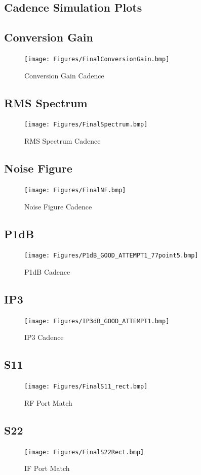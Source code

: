 \documentclass{article}                                                         %
\begin{document}
\newpage
\begin{appendices}
\section{Cadence Simulation Plots}\label{app:cresults}
\subsection{Conversion Gain}
\begin{figure}[H]
  \centering
  \texttt{[image: Figures/FinalConversionGain.bmp]}
  \caption{Conversion Gain Cadence}
    \label{fig:cGain}
\end{figure}
\subsection{RMS Spectrum}
\begin{figure}[H]
  \centering
  \texttt{[image: Figures/FinalSpectrum.bmp]}
  \caption{RMS Spectrum Cadence}
    \label{fig:cSpectrum}
\end{figure}
\subsection{Noise Figure}
\begin{figure}[H]
  \centering
  \texttt{[image: Figures/FinalNF.bmp]}
  \caption{Noise Figure Cadence}
    \label{fig:cNF}
\end{figure}
\subsection{P1dB}
\begin{figure}[H]
  \centering
  \texttt{[image: Figures/P1dB\_GOOD\_ATTEMPT1\_77point5.bmp]}
  \caption{P1dB Cadence}
    \label{fig:cP1db}
\end{figure}
\subsection{IP3}
\begin{figure}[H]
  \centering
  \texttt{[image: Figures/IP3dB\_GOOD\_ATTEMPT1.bmp]}
  \caption{IP3 Cadence}
    \label{fig:cIP3}
\end{figure}
\subsection{S11}
\begin{figure}[H]
  \centering
  \texttt{[image: Figures/FinalS11\_rect.bmp]}
  \caption{RF Port Match}
    \label{fig:cS11}
\end{figure}
\subsection{S22}
\begin{figure}[H]
  \centering
  \texttt{[image: Figures/FinalS22Rect.bmp]}
  \caption{IF Port Match}
    \label{fig:cS22}
\end{figure}


\end{appendices}
\end{document}

